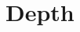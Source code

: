 \documentclass[../main]{subfiles}
\begin{document}
\chapter{Depth}\label{ch:06}

\setcounter{section}{14}


\end{document}

